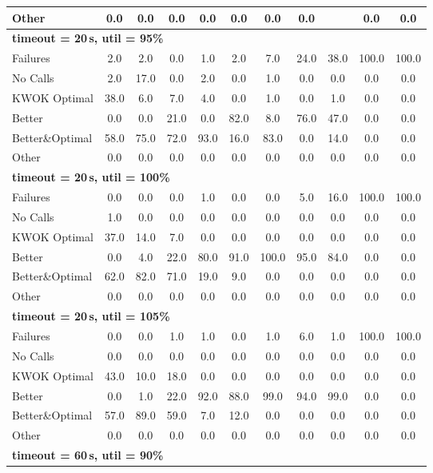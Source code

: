 \begin{tabular}{l cccccccccc}
Other & 0.0 & 0.0 & 0.0 & 0.0 & 0.0 & 0.0 & 0.0 & \text{--} & 0.0 & 0.0 \\
\midrule
\multicolumn{11}{l}{\textbf{timeout = 20\,s, util = 95\%}} \\
\midrule
Failures & 2.0 & 2.0 & 0.0 & 1.0 & 2.0 & 7.0 & 24.0 & 38.0 & 100.0 & 100.0 \\
No Calls & 2.0 & 17.0 & 0.0 & 2.0 & 0.0 & 1.0 & 0.0 & 0.0 & 0.0 & 0.0 \\
KWOK Optimal & 38.0 & 6.0 & 7.0 & 4.0 & 0.0 & 1.0 & 0.0 & 1.0 & 0.0 & 0.0 \\
Better & 0.0 & 0.0 & 21.0 & 0.0 & 82.0 & 8.0 & 76.0 & 47.0 & 0.0 & 0.0 \\
Better\&Optimal & 58.0 & 75.0 & 72.0 & 93.0 & 16.0 & 83.0 & 0.0 & 14.0 & 0.0 & 0.0 \\
Other & 0.0 & 0.0 & 0.0 & 0.0 & 0.0 & 0.0 & 0.0 & 0.0 & 0.0 & 0.0 \\
\midrule
\multicolumn{11}{l}{\textbf{timeout = 20\,s, util = 100\%}} \\
\midrule
Failures & 0.0 & 0.0 & 0.0 & 1.0 & 0.0 & 0.0 & 5.0 & 16.0 & 100.0 & 100.0 \\
No Calls & 1.0 & 0.0 & 0.0 & 0.0 & 0.0 & 0.0 & 0.0 & 0.0 & 0.0 & 0.0 \\
KWOK Optimal & 37.0 & 14.0 & 7.0 & 0.0 & 0.0 & 0.0 & 0.0 & 0.0 & 0.0 & 0.0 \\
Better & 0.0 & 4.0 & 22.0 & 80.0 & 91.0 & 100.0 & 95.0 & 84.0 & 0.0 & 0.0 \\
Better\&Optimal & 62.0 & 82.0 & 71.0 & 19.0 & 9.0 & 0.0 & 0.0 & 0.0 & 0.0 & 0.0 \\
Other & 0.0 & 0.0 & 0.0 & 0.0 & 0.0 & 0.0 & 0.0 & 0.0 & 0.0 & 0.0 \\
\midrule
\multicolumn{11}{l}{\textbf{timeout = 20\,s, util = 105\%}} \\
\midrule
Failures & 0.0 & 0.0 & 1.0 & 1.0 & 0.0 & 1.0 & 6.0 & 1.0 & 100.0 & 100.0 \\
No Calls & 0.0 & 0.0 & 0.0 & 0.0 & 0.0 & 0.0 & 0.0 & 0.0 & 0.0 & 0.0 \\
KWOK Optimal & 43.0 & 10.0 & 18.0 & 0.0 & 0.0 & 0.0 & 0.0 & 0.0 & 0.0 & 0.0 \\
Better & 0.0 & 1.0 & 22.0 & 92.0 & 88.0 & 99.0 & 94.0 & 99.0 & 0.0 & 0.0 \\
Better\&Optimal & 57.0 & 89.0 & 59.0 & 7.0 & 12.0 & 0.0 & 0.0 & 0.0 & 0.0 & 0.0 \\
Other & 0.0 & 0.0 & 0.0 & 0.0 & 0.0 & 0.0 & 0.0 & 0.0 & 0.0 & 0.0 \\
\midrule
\multicolumn{11}{l}{\textbf{timeout = 60\,s, util = 90\%}} \\

\end{tabular}
